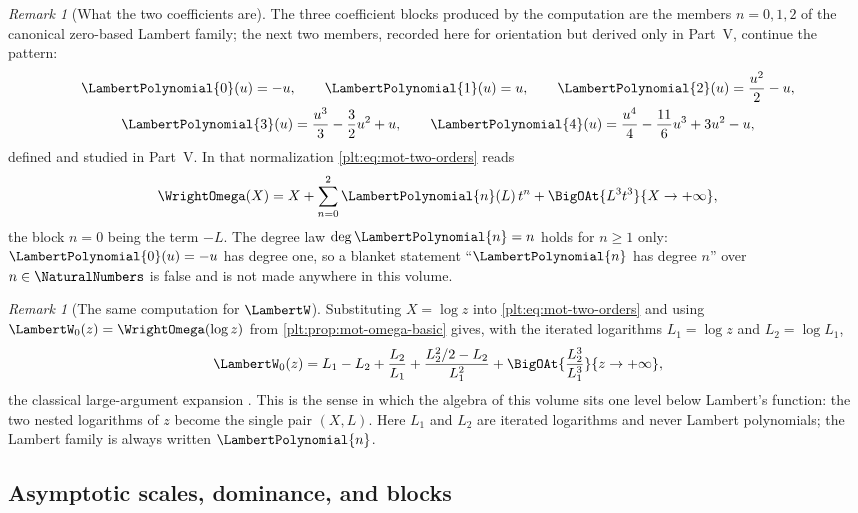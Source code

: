 \documentclass[11pt,oneside]{article}
\theoremstyle{plain}
\theoremstyle{definition}
\theoremstyle{remark}
\newtheorem{remark}[theorem]{Remark}
\newcommand{\LamP}[1]{\LambertPolynomial{#1}}
\begin{document}
\begin{remark}[What the two coefficients are]
\label{plt:rmk:mot-lambert-preview}
The three coefficient blocks produced by the computation are the members
\(n=0,1,2\) of the canonical zero-based Lambert family; the next two members,
recorded here for orientation but derived only in Part~V, continue the
pattern:
\begin{gather}
  \LamP{0}(u)=-u,\qquad
  \LamP{1}(u)=u,\qquad
  \LamP{2}(u)=\frac{u^{2}}{2}-u,
  \label{plt:eq:mot-lambert-first}\\
  \LamP{3}(u)=\frac{u^{3}}{3}-\frac{3}{2}u^{2}+u,\qquad
  \LamP{4}(u)=\frac{u^{4}}{4}-\frac{11}{6}u^{3}+3u^{2}-u,
  \notag
\end{gather}
defined and studied in Part~V.  In that normalization
\eqref{plt:eq:mot-two-orders} reads
\[
  \WrightOmega(X)=X+\sum_{n=0}^{2}\LamP{n}(L)\,t^{n}
   +\BigOAt{L^{3}t^{3}}{X\to+\infty},
\]
the block \(n=0\) being the term \(-L\).  The degree law \(\deg\LamP{n}=n\)
holds for \(n\ge1\) only: \(\LamP{0}(u)=-u\) has degree one, so a blanket
statement ``\(\LamP{n}\) has degree \(n\)'' over \(n\in\NaturalNumbers\) is
false and is not made anywhere in this volume.
\end{remark}

\begin{remark}[The same computation for \(\LambertW\)]
\label{plt:rmk:mot-lambert-transfer}
Substituting \(X=\log z\) into \eqref{plt:eq:mot-two-orders} and using
\(\LambertW_{0}(z)=\WrightOmega(\log z)\) from
\cref{plt:prop:mot-omega-basic} gives, with the iterated logarithms
\(L_{1}=\log z\) and \(L_{2}=\log L_{1}\),
\begin{equation}\label{plt:eq:mot-W-two-orders}
  \LambertW_{0}(z)=L_{1}-L_{2}+\frac{L_{2}}{L_{1}}
   +\frac{L_{2}^{2}/2-L_{2}}{L_{1}^{2}}
   +\BigOAt{\frac{L_{2}^{3}}{L_{1}^{3}}}{z\to+\infty},
\end{equation}
the classical large-argument expansion \cite{corless-et-al-1996,dlmf-W}.  This
is the sense in which the algebra of this volume sits one level below Lambert's
function: the two nested logarithms of \(z\) become the single pair
\((X,L)\).  Here \(L_{1}\) and \(L_{2}\) are iterated logarithms and never
Lambert polynomials; the Lambert family is always written \(\LamP{n}\).
\end{remark}

\subsection{Asymptotic scales, dominance, and blocks}
\label{plt:sec:mot-dominance}
\end{document}
